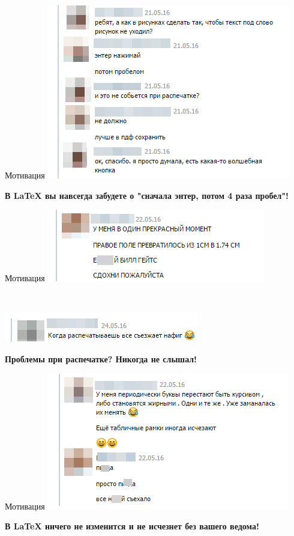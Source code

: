 \documentclass[newPxFont]{beamer}
\begin{document}
\begin{frame}{Мотивация}
    \centering
    \includegraphics[height=0.6\textheight]{m6.png}
    
    \vfill
    \alert{\textbf{В \LaTeX{} вы навсегда забудете о "сначала энтер, потом 4 раза пробел"!}}
\end{frame}


\begin{frame}{Мотивация}
    \centering
    \includegraphics[scale=0.5]{m7.png}

	\mbox{ }     
     
    \includegraphics[scale=0.6]{m9.png}
    
    \vfill
    \alert{\textbf{Проблемы при распечатке? Никогда не слышал!}}
\end{frame}


\begin{frame}{Мотивация}
    \centering
    \includegraphics[scale=0.5]{m8.png}
    
    \vfill
    \alert{\textbf{В \LaTeX{} ничего не изменится и не исчезнет без вашего ведома!}}
\end{frame}
\end{document}
